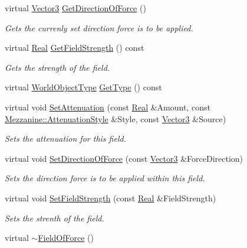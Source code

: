 \begin{DoxyCompactItemize}
virtual \hyperlink{classMezzanine_1_1Vector3}{Vector3} \hyperlink{classMezzanine_1_1FieldOfForce_aa38710cbe67fad1b0be2e0a414d8e55c}{GetDirectionOfForce} ()
\begin{DoxyCompactList}\small\item\em Gets the currenly set direction force is to be applied. \item\end{DoxyCompactList}\item 
virtual \hyperlink{namespaceMezzanine_a726731b1a7df72bf3583e4a97282c6f6}{Real} \hyperlink{classMezzanine_1_1FieldOfForce_ae8071fe3ad4397b57cff5f3816d72e02}{GetFieldStrength} () const 
\begin{DoxyCompactList}\small\item\em Gets the strength of the field. \item\end{DoxyCompactList}\item 
virtual \hyperlink{namespaceMezzanine_a30335416fc857844e8360c84d1d1b56c}{WorldObjectType} \hyperlink{classMezzanine_1_1FieldOfForce_a67c2eceec144d9a20f1bb3777b0bd666}{GetType} () const 
\item 
virtual void \hyperlink{classMezzanine_1_1FieldOfForce_aa2ba435821f4abc4c59b0ca99f077759}{SetAttenuation} (const \hyperlink{namespaceMezzanine_a726731b1a7df72bf3583e4a97282c6f6}{Real} \&Amount, const \hyperlink{namespaceMezzanine_a2d10a79e11a2031df10af540eede12fa}{Mezzanine::AttenuationStyle} \&Style, const \hyperlink{classMezzanine_1_1Vector3}{Vector3} \&Source)
\begin{DoxyCompactList}\small\item\em Sets the attenuation for this field. \item\end{DoxyCompactList}\item 
virtual void \hyperlink{classMezzanine_1_1FieldOfForce_aaa4df06c275221b2b7c313a7d45ec71a}{SetDirectionOfForce} (const \hyperlink{classMezzanine_1_1Vector3}{Vector3} \&ForceDirection)
\begin{DoxyCompactList}\small\item\em Sets the direction force is to be applied within this field. \item\end{DoxyCompactList}\item 
virtual void \hyperlink{classMezzanine_1_1FieldOfForce_abef745957f95ac58f756d84f00fbf549}{SetFieldStrength} (const \hyperlink{namespaceMezzanine_a726731b1a7df72bf3583e4a97282c6f6}{Real} \&FieldStrength)
\begin{DoxyCompactList}\small\item\em Sets the strenth of the field. \item\end{DoxyCompactList}\item 
\hypertarget{classMezzanine_1_1FieldOfForce_ae9d68bc47f8598fd764b4ed9ae28a89c}{
virtual \hyperlink{classMezzanine_1_1FieldOfForce_ae9d68bc47f8598fd764b4ed9ae28a89c}{$\sim$FieldOfForce} ()}
\label{classMezzanine_1_1FieldOfForce_ae9d68bc47f8598fd764b4ed9ae28a89c}


\end{DoxyCompactItemize}
